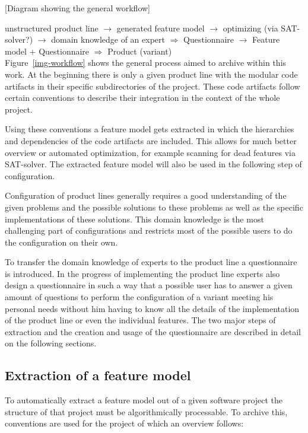 [Diagram showing the general workflow]

unstructured product line $\rightarrow$ generated feature model $\rightarrow$ optimizing (via SAT-solver?) $\rightarrow$ domain knowledge of an expert $\Rightarrow$ Questionnaire $\rightarrow$ Feature model + Questionnaire $\Rightarrow$ Product (variant)\\

Figure~\ref{img-workflow} shows the general process aimed to archive within this work. At the beginning there is only a given product line with the modular code artifacts in their specific subdirectories of the project. These code artifacts follow certain conventions to describe their integration in the context of the whole project.

Using these conventions a feature model gets extracted in which the hierarchies and dependencies of the code artifacts are included. This allows for much better overview or automated optimization, for example scanning for dead features via SAT-solver. The extracted feature model will also be used in the following step of configuration.

Configuration of product lines generally requires a good understanding of the given problems and the possible solutions to these problems as well as the specific implementations of these solutions. This domain knowledge is the most challenging part of configurations and restricts most of the possible users to do the configuration on their own.

To transfer the domain knowledge of experts to the product line a questionnaire is introduced. In the progress of implementing the product line experts also design a questionnaire in such a way that a possible user has to answer a given amount of questions to perform the configuration of a variant meeting his personal needs without him having to know all the details of the implementation of the product line or even the individual features. The two major steps of extraction and the creation and usage of the questionnaire are described in detail on the following sections.


\subsection{Extraction of a feature model}
To automatically extract a feature model out of a given software project the structure of that project must be algorithmically processable. To archive this, conventions are used for the project of which an overview follows:

